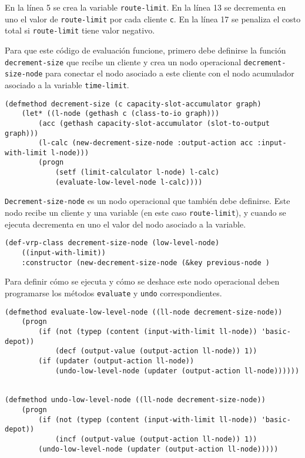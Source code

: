 En la línea 5 se crea la variable \texttt{route-limit}. En la línea 13 se decrementa en uno el valor de \texttt{route-limit} por cada cliente \texttt{c}. En la línea 17 se penaliza el costo total si \texttt{route-limit} tiene valor negativo. 

Para que este código de evaluación funcione, primero debe definirse la función \texttt{decrement-size} que recibe un cliente y crea un nodo operacional \texttt{decrement-size-node} para conectar el nodo asociado a este cliente con el nodo acumulador asociado a la variable \texttt{time-limit}. 


\begin{lstlisting}
(defmethod decrement-size (c capacity-slot-accumulator graph)
	(let* ((l-node (gethash c (class-to-io graph)))
		(acc (gethash capacity-slot-accumulator (slot-to-output graph)))
		(l-calc (new-decrement-size-node :output-action acc :input-with-limit l-node)))
		(progn
			(setf (limit-calculator l-node) l-calc)
			(evaluate-low-level-node l-calc))))

\end{lstlisting}


\texttt{Decrement-size-node} es un nodo operacional que también debe definirse. Este nodo recibe un cliente y una variable (en este caso \texttt{route-limit}), y cuando se ejecuta decrementa en uno el valor del nodo asociado a la variable.

\begin{lstlisting}
(def-vrp-class decrement-size-node (low-level-node)
	((input-with-limit))
	:constructor (new-decrement-size-node (&key previous-node )
\end{lstlisting}


Para definir cómo se ejecuta y cómo se deshace este nodo operacional deben programarse los métodos \texttt{evaluate} y \texttt{undo} correspondientes.

\begin{lstlisting}
(defmethod evaluate-low-level-node ((ll-node decrement-size-node))
	(progn
		(if (not (typep (content (input-with-limit ll-node)) 'basic-depot))
			(decf (output-value (output-action ll-node)) 1))
		(if (updater (output-action ll-node))
			(undo-low-level-node (updater (output-action ll-node))))))


(defmethod undo-low-level-node ((ll-node decrement-size-node))
	(progn
		(if (not (typep (content (input-with-limit ll-node)) 'basic-depot))
			(incf (output-value (output-action ll-node)) 1))
		(undo-low-level-node (updater (output-action ll-node)))))

\end{lstlisting}

